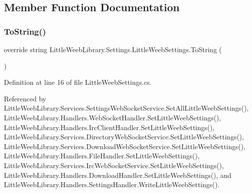 \subsection{Member Function Documentation}
\mbox{\label{class_little_weeb_library_1_1_settings_1_1_little_weeb_settings_a5a5b722dd8e117be810022882795b6ae}} 
\subsubsection{\texorpdfstring{To\+String()}{ToString()}}
{\footnotesize\ttfamily override string Little\+Weeb\+Library.\+Settings.\+Little\+Weeb\+Settings.\+To\+String (\begin{DoxyParamCaption}{ }\end{DoxyParamCaption})}



Definition at line 16 of file Little\+Weeb\+Settings.\+cs.



Referenced by Little\+Weeb\+Library.\+Services.\+Settings\+Web\+Socket\+Service.\+Set\+All\+Little\+Weeb\+Settings(), Little\+Weeb\+Library.\+Handlers.\+Web\+Socket\+Handler.\+Set\+Little\+Weeb\+Settings(), Little\+Weeb\+Library.\+Handlers.\+Irc\+Client\+Handler.\+Set\+Little\+Weeb\+Settings(), Little\+Weeb\+Library.\+Services.\+Directory\+Web\+Socket\+Service.\+Set\+Little\+Weeb\+Settings(), Little\+Weeb\+Library.\+Services.\+Download\+Web\+Socket\+Service.\+Set\+Little\+Weeb\+Settings(), Little\+Weeb\+Library.\+Handlers.\+File\+Handler.\+Set\+Little\+Weeb\+Settings(), Little\+Weeb\+Library.\+Services.\+Irc\+Web\+Socket\+Service.\+Set\+Little\+Weeb\+Settings(), Little\+Weeb\+Library.\+Handlers.\+Download\+Handler.\+Set\+Little\+Weeb\+Settings(), and Little\+Weeb\+Library.\+Handlers.\+Settings\+Handler.\+Write\+Little\+Weeb\+Settings().


